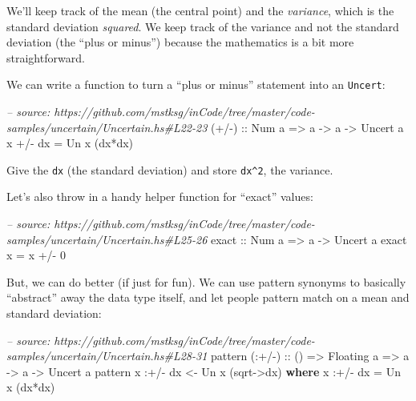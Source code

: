 \documentclass[]{article}
\newenvironment{Shaded}{}{}
\newcommand{\KeywordTok}[1]{\textcolor[rgb]{0.00,0.44,0.13}{\textbf{{#1}}}}
\newcommand{\DataTypeTok}[1]{\textcolor[rgb]{0.56,0.13,0.00}{{#1}}}
\newcommand{\DecValTok}[1]{\textcolor[rgb]{0.25,0.63,0.44}{{#1}}}
\newcommand{\CommentTok}[1]{\textcolor[rgb]{0.38,0.63,0.69}{\textit{{#1}}}}
\newcommand{\OtherTok}[1]{\textcolor[rgb]{0.00,0.44,0.13}{{#1}}}
\newcommand{\FunctionTok}[1]{\textcolor[rgb]{0.02,0.16,0.49}{{#1}}}
\newcommand{\NormalTok}[1]{{#1}}
\begin{document}
We'll keep track of the mean (the central point) and the
\emph{variance}, which is the standard deviation \emph{squared}. We keep
track of the variance and not the standard deviation (the ``plus or
minus'') because the mathematics is a bit more straightforward.

We can write a function to turn a ``plus or minus'' statement into an
\texttt{Uncert}:

\begin{Shaded}
\begin{Highlighting}[]
\CommentTok{-- source: https://github.com/mstksg/inCode/tree/master/code-samples/uncertain/Uncertain.hs#L22-23}
\OtherTok{(+/-) ::} \DataTypeTok{Num} \NormalTok{a }\OtherTok{=>} \NormalTok{a }\OtherTok{->} \NormalTok{a }\OtherTok{->} \DataTypeTok{Uncert} \NormalTok{a}
\NormalTok{x }\FunctionTok{+/-} \NormalTok{dx }\FunctionTok{=} \DataTypeTok{Un} \NormalTok{x (dx}\FunctionTok{*}\NormalTok{dx)}
\end{Highlighting}
\end{Shaded}

Give the \texttt{dx} (the standard deviation) and store
\texttt{dx\^{}2}, the variance.

Let's also throw in a handy helper function for ``exact'' values:

\begin{Shaded}
\begin{Highlighting}[]
\CommentTok{-- source: https://github.com/mstksg/inCode/tree/master/code-samples/uncertain/Uncertain.hs#L25-26}
\OtherTok{exact ::} \DataTypeTok{Num} \NormalTok{a }\OtherTok{=>} \NormalTok{a }\OtherTok{->} \DataTypeTok{Uncert} \NormalTok{a}
\NormalTok{exact x }\FunctionTok{=} \NormalTok{x }\FunctionTok{+/-} \DecValTok{0}
\end{Highlighting}
\end{Shaded}

But, we can do better (if just for fun). We can use pattern synonyms to
basically ``abstract'' away the data type itself, and let people pattern
match on a mean and standard deviation:

\begin{Shaded}
\begin{Highlighting}[]
\CommentTok{-- source: https://github.com/mstksg/inCode/tree/master/code-samples/uncertain/Uncertain.hs#L28-31}
\NormalTok{pattern}\OtherTok{ (:+/-) ::} \NormalTok{() }\OtherTok{=>} \DataTypeTok{Floating} \NormalTok{a }\OtherTok{=>} \NormalTok{a }\OtherTok{->} \NormalTok{a }\OtherTok{->} \DataTypeTok{Uncert} \NormalTok{a}
\NormalTok{pattern x }\FunctionTok{:+/-} \NormalTok{dx }\OtherTok{<-} \DataTypeTok{Un} \NormalTok{x (sqrt}\OtherTok{->}\NormalTok{dx)}
  \KeywordTok{where}
    \NormalTok{x }\FunctionTok{:+/-} \NormalTok{dx }\FunctionTok{=} \DataTypeTok{Un} \NormalTok{x (dx}\FunctionTok{*}\NormalTok{dx)}
\end{Highlighting}
\end{Shaded}
\end{document}
